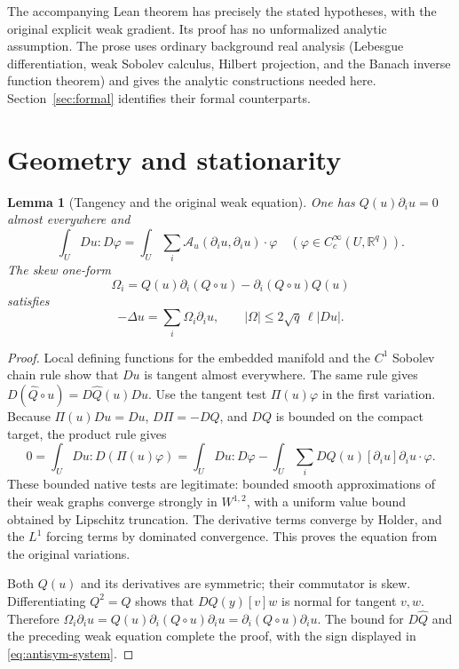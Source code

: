 \documentclass[11pt,a4paper]{article}
\numberwithin{equation}{section}
\newtheorem{lemma}[theorem]{Lemma}
\theoremstyle{definition}
\theoremstyle{remark}
\newcommand{\R}{\mathbb R}
\begin{document}
The accompanying Lean theorem has precisely the stated hypotheses, with
the original explicit weak gradient. Its proof has no unformalized
analytic assumption. The prose uses ordinary background real analysis
(Lebesgue differentiation, weak Sobolev calculus, Hilbert projection, and
the Banach inverse function theorem) and gives the analytic constructions
needed here. Section~\ref{sec:formal} identifies their formal counterparts.

\section{Geometry and stationarity}\label{sec:geometry}
\begin{lemma}[Tangency and the original weak equation]\label{lem:geometry}
One has $Q(u)\partial_i u=0$ almost everywhere and
\begin{equation}\label{eq:harmonic-equation}
 \int_U Du:D\varphi
 =\int_U\sum_i\mathcal A_u(\partial_i u,\partial_i u)\cdot\varphi
 \quad(\varphi\in C_c^\infty(U,\R^q)).
\end{equation}
The skew one-form
\begin{equation}\label{eq:omega}
 \Omega_i=Q(u)\partial_i(Q\circ u)-\partial_i(Q\circ u)Q(u)
\end{equation}
satisfies
\begin{equation}\label{eq:antisym-system}
 -\Delta u=\sum_i\Omega_i\partial_i u,
 \qquad |\Omega|\leq2\sqrt q\,\ell|Du|.
\end{equation}
\end{lemma}
\begin{proof}
Local defining functions for the embedded manifold and the $C^1$ Sobolev
chain rule show that $Du$ is tangent almost everywhere. The same rule gives
$D(\widehat Q\circ u)=D\widehat Q(u)Du$. Use the tangent test
$\Pi(u)\varphi$ in the first variation. Because $\Pi(u)Du=Du$,
$D\Pi=-DQ$, and $DQ$ is bounded on the compact target, the product rule
gives
\[
 0=\int_U Du:D(\Pi(u)\varphi)
  =\int_U Du:D\varphi
     -\int_U\sum_i DQ(u)[\partial_i u]\partial_i u\cdot\varphi.
\]
These bounded native tests are legitimate: bounded smooth approximations
of their weak graphs converge strongly in $W^{1,2}$, with a uniform value
bound obtained by Lipschitz truncation. The derivative terms converge by
Holder, and the $L^1$ forcing terms by dominated convergence. This proves
the equation from the original variations.

Both $Q(u)$ and its derivatives are symmetric; their commutator is skew.
Differentiating $Q^2=Q$ shows that $DQ(y)[v]w$ is normal for tangent
$v,w$. Therefore
$\Omega_i\partial_i u=Q(u)\partial_i(Q\circ u)\partial_i u
=\partial_i(Q\circ u)\partial_i u$.
The bound for $D\widehat Q$ and the preceding weak equation complete
the proof, with the sign displayed in \eqref{eq:antisym-system}.
\end{proof}
\end{document}
